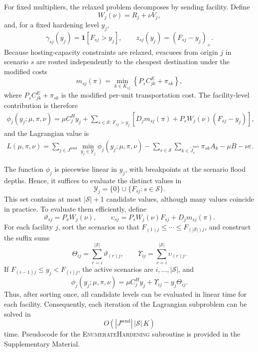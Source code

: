 \documentclass[preprint,11pt,authoryear]{elsarticle}
\begin{document}
For fixed multipliers, the relaxed problem decomposes by sending facility.
Define
\begin{equation*}
W_j(\nu)=R_j+\nu V_j,
\end{equation*}
and, for a fixed hardening level $y_j$,
\begin{equation*}
\gamma_{sj}(y_j)=\mathbf 1[F_{sj}>y_j],
\qquad
z_{sj}(y_j)=(F_{sj}-y_j)_+.
\end{equation*}
Because hosting-capacity constraints are relaxed, evacuees from origin $j$ in scenario $s$ are routed independently to the cheapest destination under the modified costs
\begin{equation}
m_{sj}(\pi)
=
\min_{k\in K_{sj}}
\left\{
P_sC_{jk}^E+\pi_{sk}
\right\},
\label{LR:modified_cost}
\end{equation}
where $P_s C^E_{jk}+\pi_{sk}$ is the modified per-unit transportation cost. The facility-level contribution is therefore
\begin{align*}
\phi_j(y_j;\mu,\pi,\nu)
=
\mu C_j^Hy_j
+
\sum_{s\in\mathcal S:\,F_{sj}>y_j}
\left[
D_jm_{sj}(\pi)
+
P_sW_j(\nu)(F_{sj}-y_j)
\right],
\end{align*}
and the Lagrangian value is
\begin{align*}
L(\mu,\pi,\nu)
=
\sum_{j\in J^{\mathrm{send}}}
\min_{y_j\in\mathcal Y_j}
\phi_j(y_j;\mu,\pi,\nu)
-
\sum_{s\in\mathcal S}
\sum_{k\in\widetilde J_s^{\mathrm{recv}}}
\pi_{sk}A_k
-\mu B-\nu\varepsilon.
\end{align*}

The function $\phi_j$ is piecewise linear in $y_j$, with breakpoints at the
scenario flood depths. Hence, it suffices to evaluate the distinct values in
\begin{equation}
\mathcal Y_j
=
\{0\}
\cup
\{F_{sj}:s\in\mathcal S\}.
\label{LR:candidate_levels}
\end{equation}
This set contains at most $|\mathcal S|+1$ candidate values, although many
values coincide in practice. To evaluate them efficiently, define
\begin{equation*}
\vartheta_{sj}=P_sW_j(\nu),
\qquad
\upsilon_{sj}=P_sW_j(\nu)F_{sj}+D_jm_{sj}(\pi).
\end{equation*}
For each facility \(j\), sort the scenarios so that
\(F_{(1)j}\leq\cdots\leq F_{(|\mathcal S|)j}\), and construct the suffix sums
\begin{equation*}
\Theta_{ij}=\sum_{r=i}^{|\mathcal S|}\vartheta_{(r)j},
\qquad
\Upsilon_{ij}=\sum_{r=i}^{|\mathcal S|}\upsilon_{(r)j}.
\end{equation*}
If \(F_{(i-1)j}\leq y_j<F_{(i)j}\), the active scenarios are
\(i,\ldots,|\mathcal S|\), and
\begin{equation}
\phi_j(y_j;\mu,\pi,\nu)
=\mu C_j^Hy_j+\Upsilon_{ij}-y_j\Theta_{ij}.
\label{eq:suffix_phi}
\end{equation}
Thus, after sorting once, all candidate levels can be evaluated in linear
time for each facility. Consequently, each iteration of the Lagrangian
subproblem can be solved in
\[
O\!\left(
|J^{\mathrm{send}}|\,|\mathcal S|\,K
\right)
\]
time. Pseudocode for the \textsc{EnumerateHardening} subroutine is provided
in the Supplementary Material.
\end{document}
